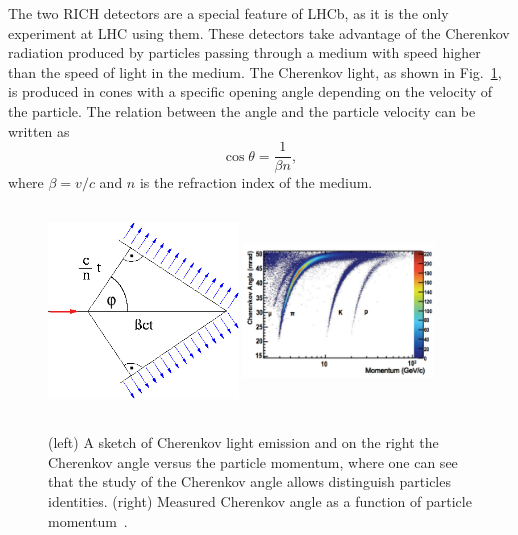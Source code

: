 The two RICH detectors are a special feature of LHCb, as it is the only experiment at LHC using them. 
These detectors take advantage of the Cherenkov radiation produced by particles passing through a medium
with speed higher than the speed of light in the medium. The Cherenkov light, as shown in Fig.~\ref{Cherenkov}, 
is produced in cones with a specific opening angle depending on the velocity of the particle. The relation
between the angle and the particle velocity can be written as 
%
\begin{equation}
\cos\theta = \frac{1}{\beta n},
\end{equation}
%
where $\beta = v/c$ and $n$ is the refraction index of the medium.
%
\begin{figure}[h!]
\centering
\includegraphics[width=0.45\textwidth,height=5.5cm]{Detector/figs/detector/Cherenkov.png}
\includegraphics[width=0.45\textwidth,height=5.5cm]{Detector/figs/changle_vs_momentum.png}
\caption{(left) A sketch of Cherenkov light emission and on the right the Cherenkov
angle versus the particle momentum, where one can see that the study of the Cherenkov angle
allows distinguish particles identities. (right) Measured Cherenkov angle as a function of particle momentum~\cite{Alves:2008zz}. }
\label{Cherenkov}
\end{figure}

